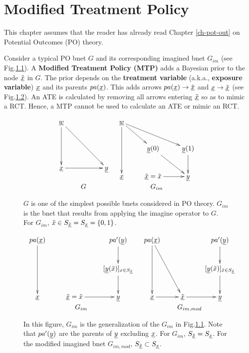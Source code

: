 \chapter{Modified Treatment Policy}
\label{ch-modi-treat}

This  chapter
assumes that the
reader has
already read
Chapter \ref{ch-pot-out} on Potential Outcomes (PO) theory.

Consider a typical PO bnet $G$
and its corresponding imagined bnet $G_{im}$ (see Fig.\ref{fig-modi-po}).
A {\bf Modified Treatment Policy (MTP)} adds a Bayesian prior to the
 node $\underline{{\tilde{x}}}$ in $G$.
The prior depends on the {\bf treatment
variable} (a.k.a., {\bf exposure variable}) ${\underline{x}}$ and its parents $pa({\underline{x}})$.
This adds arrows $pa({\underline{x}})\rightarrow\underline{{\tilde{x}}}$
and ${\underline{x}}\rightarrow \underline{{\tilde{x}}}$ (see Fig.\ref{fig-unmodi-modi}).
An ATE is calculated by removing all arrows entering $\underline{{\tilde{x}}}$
so as to mimic a RCT. Hence, a MTP cannot be used to calculate
an ATE or mimic an RCT.


\begin{figure}[h!]
$$
\begin{array}{cc}
\xymatrix{
\rvw
\ar[dd]\ar[ddrr]
\\
\\
\rvx \ar[rr]
&
&\rvy
}
&
\xymatrix{
\rvw
\ar[dd]\ar[dr] \ar[drr]
\\
& \rvy(0)\ar[dr]
&\rvy(1)\ar[d]
\\
\rvx
&\ul{\tilx}=\tilx\ar[r]
&\rvy
}
\\
G & G_{im}
\end{array}
$$
\caption{$G$ is one of the
simplest possible bnets considered in  PO theory.
$G_{im}$ is the bnet that results
from applying the imagine operator to $G$.
For $G_{im}$, ${\tilde{x}}\in S_{\underline{{\tilde{x}}}}=S_{\underline{x}}=\{0,1\}$.}
\label{fig-modi-po}
\end{figure}


\begin{figure}[h!]
$$
\begin{array}{cc}
\xymatrix{
pa(\rvx)
\ar[dd]
&
&pa'(\rvy)\ar[d]
\\
&&[\rvy(\tilx)]_{x\in S_{\ul{\tilx}}}\ar[d]
\\
\rvx
&\ul{\tilx}=\tilx\ar[r]
&\rvy
}
&
\xymatrix{
pa(\rvx)
\ar[dd]\ar[ddr]
&
&pa'(\rvy)\ar[d]
\\
&&[\rvy(\tilx)]_{\tilx\in S_{\ul{\tilx}}}\ar[d]
\\
\rvx\ar[r]
&\ul{\tilx}\ar[r]
&\rvy
}
\\
G_{im}
 &
G_{im,mod}
\end{array}
$$
\caption{In this figure, $G_{im}$
is the generalization of the $G_{im}$
in Fig.\ref{fig-modi-po}.
Note that $pa'({\underline{y}})$ are the parents of
${\underline{y}}$ excluding ${\underline{x}}$.
For $G_{im}$, $S_{\underline{{\tilde{x}}}}= S_{\underline{x}}$.
For the modified
imagined bnet $G_{im,mod}$, $S_{\underline{{\tilde{x}}}}\subset S_{\underline{x}}$. }
\label{fig-unmodi-modi}
\end{figure}


